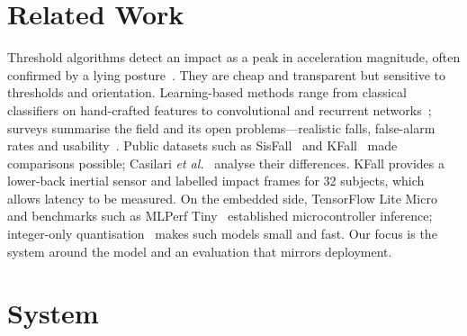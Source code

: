\documentclass[conference]{IEEEtran}
\begin{document}
\section{Related Work}
Threshold algorithms detect an impact as a peak in acceleration magnitude, often confirmed
by a lying posture~\cite{bourke2007threshold,kangas2008comparison}. They are cheap and
transparent but sensitive to thresholds and orientation. Learning-based methods range from
classical classifiers on hand-crafted features to convolutional and recurrent
networks~\cite{santos2019cnn,musci2021rnn}; surveys
summarise the field and its open problems---realistic falls, false-alarm rates and
usability~\cite{igual2013challenges,mubashir2013survey,ramachandran2020survey}. Public
datasets such as SisFall~\cite{sucerquia2017sisfall} and KFall~\cite{yu2021kfall} made
comparisons possible; Casilari \emph{et al.}~\cite{casilari2017datasets} analyse their
differences. KFall provides a lower-back inertial sensor and labelled impact frames for 32
subjects, which allows latency to be measured. On the embedded side, TensorFlow Lite
Micro~\cite{david2021tflm} and benchmarks such as MLPerf Tiny~\cite{banbury2021mlperftiny}
established microcontroller inference; integer-only quantisation~\cite{jacob2018quantization}
makes such models small and fast. Our focus is the system around the model and an
evaluation that mirrors deployment.

\section{System}
\end{document}
